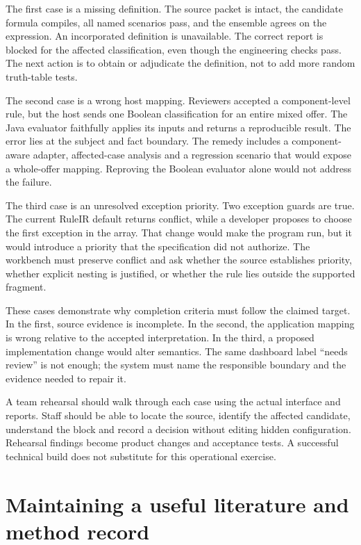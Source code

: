 \documentclass[12pt,a4paper,oneside,openany]{book}
\begin{document}
The first case is a missing definition. The source packet is intact, the candidate
formula compiles, all named scenarios pass, and the ensemble agrees on the
expression. An incorporated definition is unavailable. The correct report is
blocked for the affected classification, even though the engineering checks pass.
The next action is to obtain or adjudicate the definition, not to add more random
truth-table tests.

The second case is a wrong host mapping. Reviewers accepted a component-level
rule, but the host sends one Boolean classification for an entire mixed offer.
The Java evaluator faithfully applies its inputs and returns a reproducible
result. The error lies at the subject and fact boundary. The remedy includes a
component-aware adapter, affected-case analysis and a regression scenario that
would expose a whole-offer mapping. Reproving the Boolean evaluator alone would
not address the failure.

The third case is an unresolved exception priority. Two exception guards are
true. The current RuleIR default returns conflict, while a developer proposes to
choose the first exception in the array. That change would make the program run,
but it would introduce a priority that the specification did not authorize. The
workbench must preserve conflict and ask whether the source establishes priority,
whether explicit nesting is justified, or whether the rule lies outside the
supported fragment.

These cases demonstrate why completion criteria must follow the claimed target.
In the first, source evidence is incomplete. In the second, the application mapping
is wrong relative to the accepted interpretation. In the third, a proposed
implementation change would alter semantics. The same dashboard label ``needs
review'' is not enough; the system must name the responsible boundary and the
evidence needed to repair it.

A team rehearsal should walk through each case using the actual interface and
reports. Staff should be able to locate the source, identify the affected
candidate, understand the block and record a decision without editing hidden
configuration. Rehearsal findings become product changes and acceptance tests.
A successful technical build does not substitute for this operational exercise.

\section{Maintaining a useful literature and method record}
\label{merge:M10:13}
\end{document}
